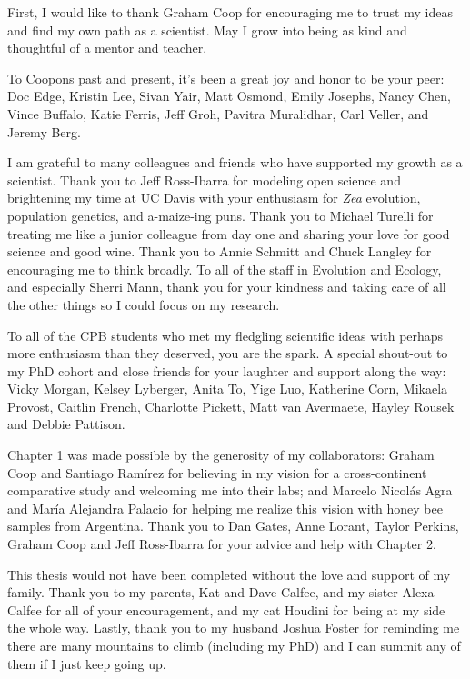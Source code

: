 First, I would like to thank Graham Coop for encouraging me to trust my ideas and find my own path as a scientist. May I grow into being as kind and thoughtful of a mentor and teacher. 

To Coopons past and present, it’s been a great joy and honor to be your peer: Doc Edge, Kristin Lee, Sivan Yair, Matt Osmond, Emily Josephs, Nancy Chen, Vince Buffalo, Katie Ferris, Jeff Groh, Pavitra Muralidhar, Carl Veller, and Jeremy Berg.

I am grateful to many colleagues and friends who have supported my growth as a scientist. Thank you to Jeff Ross-Ibarra for modeling open science and brightening my time at UC Davis with your enthusiasm for \textit{Zea} evolution, population genetics, and a-maize-ing puns. Thank you to Michael Turelli for treating me like a junior colleague from day one and sharing your love for good science and good wine. Thank you to Annie Schmitt and Chuck Langley for encouraging me to think broadly. To all of the staff in Evolution and Ecology, and especially Sherri Mann, thank you for your kindness and taking care of all the other things so I could focus on my research. 

To all of the CPB students who met my fledgling scientific ideas with perhaps more enthusiasm than they deserved, you are the spark. A special shout-out to my PhD cohort and close friends for your laughter and support along the way: Vicky Morgan, Kelsey Lyberger, Anita To, Yige Luo, Katherine Corn, Mikaela Provost, Caitlin French, Charlotte Pickett, Matt van Avermaete, Hayley Rousek and Debbie Pattison.

Chapter 1 was made possible by the generosity of my collaborators: Graham Coop and Santiago Ramírez for believing in my vision for a cross-continent comparative study and welcoming me into their labs; and Marcelo Nicolás Agra and María Alejandra Palacio for helping me realize this vision with honey bee samples from Argentina. Thank you to Dan Gates, Anne Lorant, Taylor Perkins, Graham Coop and Jeff Ross-Ibarra for your advice and help with Chapter 2.

This thesis would not have been completed without the love and support of my family. Thank you to my parents, Kat and Dave Calfee, and my sister Alexa Calfee for all of your encouragement, and my cat Houdini for being at my side the whole way. Lastly, thank you to my husband Joshua Foster for reminding me there are many mountains to climb (including my PhD) and I can summit any of them if I just keep going up.